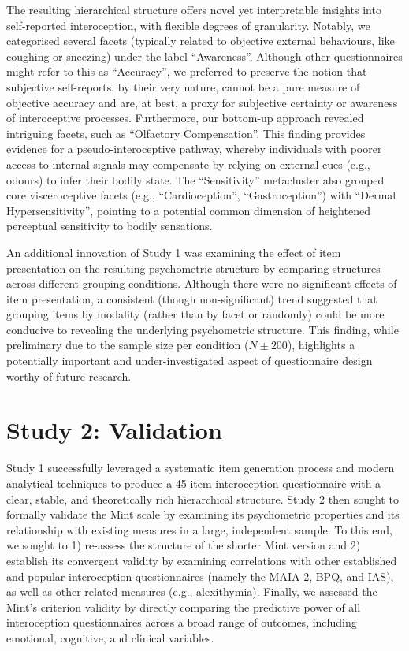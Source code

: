 \documentclass[
  jou,
  floatsintext,
  longtable,
  nolmodern,
  notxfonts,
  notimes,
  colorlinks=true,linkcolor=blue,citecolor=blue,urlcolor=blue]{apa7}
\begin{document}
The resulting hierarchical structure offers novel yet interpretable
insights into self-reported interoception, with flexible degrees of
granularity. Notably, we categorised several facets (typically related
to objective external behaviours, like coughing or sneezing) under the
label ``Awareness''. Although other questionnaires might refer to this
as ``Accuracy'', we preferred to preserve the notion that subjective
self-reports, by their very nature, cannot be a pure measure of
objective accuracy and are, at best, a proxy for subjective certainty or
awareness of interoceptive processes. Furthermore, our bottom-up
approach revealed intriguing facets, such as ``Olfactory Compensation''.
This finding provides evidence for a pseudo-interoceptive pathway,
whereby individuals with poorer access to internal signals may
compensate by relying on external cues (e.g., odours) to infer their
bodily state. The ``Sensitivity'' metacluster also grouped core
visceroceptive facets (e.g., ``Cardioception'', ``Gastroception'') with
``Dermal Hypersensitivity'', pointing to a potential common dimension of
heightened perceptual sensitivity to bodily sensations.

An additional innovation of Study 1 was examining the effect of item
presentation on the resulting psychometric structure by comparing
structures across different grouping conditions. Although there were no
significant effects of item presentation, a consistent (though
non-significant) trend suggested that grouping items by modality (rather
than by facet or randomly) could be more conducive to revealing the
underlying psychometric structure. This finding, while preliminary due
to the sample size per condition (\(N \pm 200\)), highlights a
potentially important and under-investigated aspect of questionnaire
design worthy of future research.

\section{Study 2: Validation}\label{study-2-validation}

Study 1 successfully leveraged a systematic item generation process and
modern analytical techniques to produce a 45-item interoception
questionnaire with a clear, stable, and theoretically rich hierarchical
structure. Study 2 then sought to formally validate the Mint scale by
examining its psychometric properties and its relationship with existing
measures in a large, independent sample. To this end, we sought to 1)
re-assess the structure of the shorter Mint version and 2) establish its
convergent validity by examining correlations with other established and
popular interoception questionnaires (namely the MAIA-2, BPQ, and IAS),
as well as other related measures (e.g., alexithymia). Finally, we
assessed the Mint's criterion validity by directly comparing the
predictive power of all interoception questionnaires across a broad
range of outcomes, including emotional, cognitive, and clinical
variables.
\end{document}
